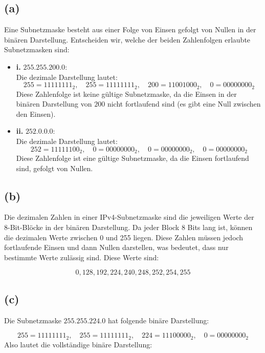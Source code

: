 \documentclass[a4paper]{scrartcl}
\begin{document}
\subsection*{(a) }

Eine Subnetzmaske besteht aus einer Folge von Einsen gefolgt von Nullen in der binären Darstellung. Entscheiden wir, welche der beiden Zahlenfolgen erlaubte Subnetzmasken sind:

\begin{itemize}
    \item \textbf{i.} $255.255.200.0$: \\
    Die dezimale Darstellung lautet:
    \[
    255 = 11111111_2, \quad 255 = 11111111_2, \quad 200 = 11001000_2, \quad 0 = 00000000_2
    \]
    Diese Zahlenfolge ist keine gültige Subnetzmaske, da die Einsen in der binären Darstellung von $200$ nicht fortlaufend sind (es gibt eine Null zwischen den Einsen).
    
    \item \textbf{ii.} $252.0.0.0$: \\
    Die dezimale Darstellung lautet:
    \[
    252 = 11111100_2, \quad 0 = 00000000_2, \quad 0 = 00000000_2, \quad 0 = 00000000_2
    \]
    Diese Zahlenfolge ist eine gültige Subnetzmaske, da die Einsen fortlaufend sind, gefolgt von Nullen.
\end{itemize}

\subsection*{(b) }

Die dezimalen Zahlen in einer IPv4-Subnetzmaske sind die jeweiligen Werte der 8-Bit-Blöcke in der binären Darstellung. Da jeder Block 8 Bits lang ist, können die dezimalen Werte zwischen 0 und 255 liegen. Diese Zahlen müssen jedoch fortlaufende Einsen und dann Nullen darstellen, was bedeutet, dass nur bestimmte Werte zulässig sind. Diese Werte sind:

\[
0, 128, 192, 224, 240, 248, 252, 254, 255
\]

\subsection*{(c)}

Die Subnetzmaske $255.255.224.0$ hat folgende binäre Darstellung:

\[
255 = 11111111_2, \quad 255 = 11111111_2, \quad 224 = 11100000_2, \quad 0 = 00000000_2
\]
Also lautet die vollständige binäre Darstellung:
\end{document}
